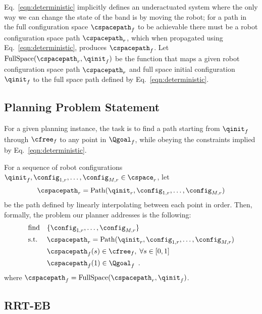 Eq.~\eqref{eqn:deterministic} implicitly defines an underactuated system where the only way we can change the state of the band is by moving the robot; for a path in the full configuration space $\cspacepath_f$ to be achievable there must be a robot configuration space path $\cspacepath_r$, which when propagated using Eq.~\eqref{eqn:deterministic}, produces $\cspacepath_f$. Let $\textrm{FullSpace}(\cspacepath_r, \qinit_f)$ be the function that maps a given robot configuration space path $\cspacepath_r$ and full space initial configuration $\qinit_f$ to the full space path defined by Eq.~\eqref{eqn:deterministic}.




\subsection{Planning Problem Statement}

For a given planning instance, the task is to find a path starting from $\qinit_f$ through $\cfree_f$ to any point in $\Qgoal_f$, while obeying the constraints implied by Eq.~\eqref{eqn:deterministic}.

For a sequence of robot configurations $\qinit_f, \config_{1,r}, \dots, \config_{M,r} \in \cspace_r$, let 
\begin{equation}
    \cspacepath_r = \textrm{Path}(\qinit_r, \config_{1,r}, \dots, \config_{M,r})    
\end{equation}
be the path defined by linearly interpolating between each point in order. Then, formally, the problem our planner addresses is the following:
\begin{equation}
    \begin{aligned}
        & \text{find}   & & \{ \config_{1,r}, \dots, \config_{M,r} \} \\
        & \text{s.t.}   & & \cspacepath_r = \textrm{Path}(\qinit_r, \config_{1,r}, \dots, \config_{M,r}) \\
        &               & & \cspacepath_f(s) \in \cfree_f, \; \forall s \in [0, 1] \\
        &               & & \cspacepath_f(1) \in \Qgoal_f \enspace .
    \end{aligned}
    \label{eqn:planning_problemstatement}
\end{equation}
\noindent where $\cspacepath_f = \textrm{FullSpace}(\cspacepath_r, \qinit_f)$.


\subsection{RRT-EB}

